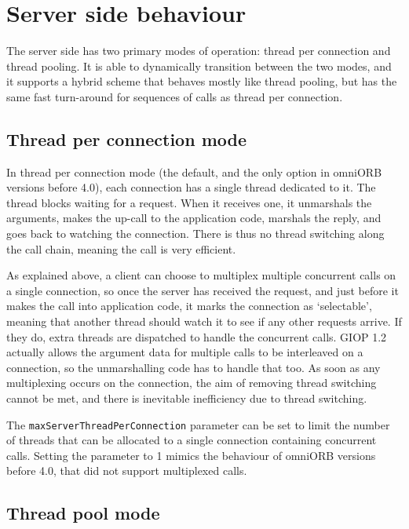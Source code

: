 \documentclass[11pt,twoside,a4paper]{book}
\newcommand{\code}[1]{\texttt{#1}}
\begin{document}
\section{Server side behaviour}

The server side has two primary modes of operation: thread per
connection and thread pooling. It is able to dynamically transition
between the two modes, and it supports a hybrid scheme that behaves
mostly like thread pooling, but has the same fast turn-around for
sequences of calls as thread per connection.

\subsection{Thread per connection mode}

In thread per connection mode (the default, and the only option in
omniORB versions before 4.0), each connection has a single thread
dedicated to it. The thread blocks waiting for a request. When it
receives one, it unmarshals the arguments, makes the up-call to the
application code, marshals the reply, and goes back to watching the
connection. There is thus no thread switching along the call chain,
meaning the call is very efficient.

As explained above, a client can choose to multiplex multiple
concurrent calls on a single connection, so once the server has
received the request, and just before it makes the call into
application code, it marks the connection as `selectable', meaning
that another thread should watch it to see if any other requests
arrive. If they do, extra threads are dispatched to handle the
concurrent calls. GIOP 1.2 actually allows the argument data for
multiple calls to be interleaved on a connection, so the unmarshalling
code has to handle that too. As soon as any multiplexing occurs on the
connection, the aim of removing thread switching cannot be met, and
there is inevitable inefficiency due to thread switching.

The \code{maxServerThreadPerConnection} parameter can be set to limit
the number of threads that can be allocated to a single connection
containing concurrent calls. Setting the parameter to 1 mimics the
behaviour of omniORB versions before 4.0, that did not support
multiplexed calls.


\subsection{Thread pool mode}
\label{sec:watchConn}
\end{document}
